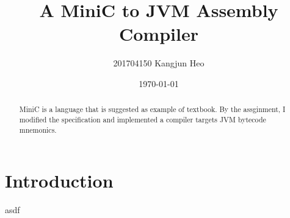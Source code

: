 \documentclass[a4paper, 12pt]{article}
\title{A MiniC to JVM Assembly Compiler}
\date{\today}
\author{201704150 Kangjun Heo}
\begin{document}
    \maketitle

    \begin{abstract}
        MiniC is a language that is suggested as example of textbook. By the assginment, I modified the specification and implemented a compiler targets JVM bytecode mnemonics.
    \end{abstract}

    \tableofcontents

    \section{Introduction}
    asdf
\end{document}
